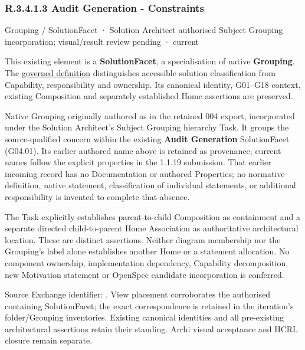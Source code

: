 \subsubsection*{R.3.4.1.3 Audit Generation - Constraints}
\label{navigation:R.3.4.1.3}

\label{element:aeb3b98e54124d94b4a68ab18de60514}
{\small Grouping / SolutionFacet · Solution Architect authorised Subject Grouping incorporation; visual/result review pending · current}\par

This existing element is a \textbf{SolutionFacet}, a specialisation of native
\textbf{Grouping}. The \href{\detokenize{../../../../../../../governance/continuum-representation.md#solutionfacet-classification--1119-candidate}}{governed definition}
distinguishes accessible solution classification from Capability, responsibility
and ownership. Its canonical identity, G01–G18 context, existing Composition
and separately established Home assertions are preserved.



Native Grouping originally authored as \texttt{} in the retained 004 export,
incorporated under the Solution Architect's Subject Grouping hierarchy Task.
It groups the source-qualified \texttt{} concern within
the existing \textbf{Audit Generation} SolutionFacet (G04.01). Its earlier authored name above is retained as provenance; current names
follow the explicit properties in the 1.1.19 submission.
That earlier incoming record has no Documentation or authored Properties; no normative
definition, native statement, classification of individual statements, or
additional responsibility is invented to complete that absence.



The Task explicitly establishes parent-to-child Composition as containment and
a separate directed child-to-parent Home Association as authoritative architectural
location. These are distinct assertions. Neither diagram membership nor the
Grouping's label alone establishes another Home or a statement allocation.
No component ownership, implementation dependency, Capability decomposition,
new Motivation statement or OpenSpec candidate incorporation is conferred.



Source Exchange identifier: \texttt{}. View placement corroborates
the authorised containing SolutionFacet; the exact correspondence is retained in the
iteration's folder/Grouping inventories. Existing canonical identities and all
pre-existing architectural assertions retain their standing. Archi visual
acceptance and HCRL closure remain separate.


